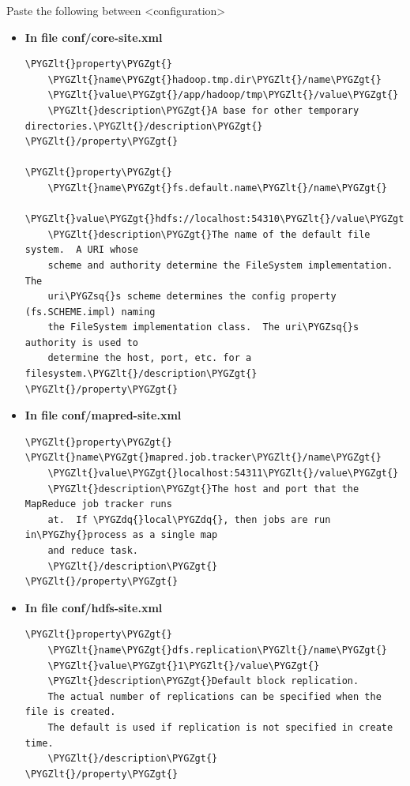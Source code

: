 \documentclass[a4paper,12pt,oneside]{sphinxmanual}
\def\PYGZlt{\char`\<}
\def\PYGZgt{\char`\>}
\def\PYGZhy{\char`\-}
\def\PYGZsq{\char`\'}
\def\PYGZdq{\char`\"}
\begin{document}
Paste the following between \textless{}configuration\textgreater{}
\begin{itemize}
\item {} 
\textbf{In file conf/core-site.xml}

\begin{Verbatim}[commandchars=\\\{\}]
\PYGZlt{}property\PYGZgt{}
    \PYGZlt{}name\PYGZgt{}hadoop.tmp.dir\PYGZlt{}/name\PYGZgt{}
    \PYGZlt{}value\PYGZgt{}/app/hadoop/tmp\PYGZlt{}/value\PYGZgt{}
    \PYGZlt{}description\PYGZgt{}A base for other temporary directories.\PYGZlt{}/description\PYGZgt{}
\PYGZlt{}/property\PYGZgt{}

\PYGZlt{}property\PYGZgt{}
    \PYGZlt{}name\PYGZgt{}fs.default.name\PYGZlt{}/name\PYGZgt{}
    \PYGZlt{}value\PYGZgt{}hdfs://localhost:54310\PYGZlt{}/value\PYGZgt{}
    \PYGZlt{}description\PYGZgt{}The name of the default file system.  A URI whose
    scheme and authority determine the FileSystem implementation.  The
    uri\PYGZsq{}s scheme determines the config property (fs.SCHEME.impl) naming
    the FileSystem implementation class.  The uri\PYGZsq{}s authority is used to
    determine the host, port, etc. for a filesystem.\PYGZlt{}/description\PYGZgt{}
\PYGZlt{}/property\PYGZgt{}
\end{Verbatim}

\item {} 
\textbf{In file conf/mapred-site.xml}

\begin{Verbatim}[commandchars=\\\{\}]
\PYGZlt{}property\PYGZgt{}
\PYGZlt{}name\PYGZgt{}mapred.job.tracker\PYGZlt{}/name\PYGZgt{}
    \PYGZlt{}value\PYGZgt{}localhost:54311\PYGZlt{}/value\PYGZgt{}
    \PYGZlt{}description\PYGZgt{}The host and port that the MapReduce job tracker runs
    at.  If \PYGZdq{}local\PYGZdq{}, then jobs are run in\PYGZhy{}process as a single map
    and reduce task.
    \PYGZlt{}/description\PYGZgt{}
\PYGZlt{}/property\PYGZgt{}
\end{Verbatim}

\item {} 
\textbf{In file conf/hdfs-site.xml}

\begin{Verbatim}[commandchars=\\\{\}]
\PYGZlt{}property\PYGZgt{}
    \PYGZlt{}name\PYGZgt{}dfs.replication\PYGZlt{}/name\PYGZgt{}
    \PYGZlt{}value\PYGZgt{}1\PYGZlt{}/value\PYGZgt{}
    \PYGZlt{}description\PYGZgt{}Default block replication.
    The actual number of replications can be specified when the file is created.
    The default is used if replication is not specified in create time.
    \PYGZlt{}/description\PYGZgt{}
\PYGZlt{}/property\PYGZgt{}
\end{Verbatim}

\end{itemize}
\end{document}
